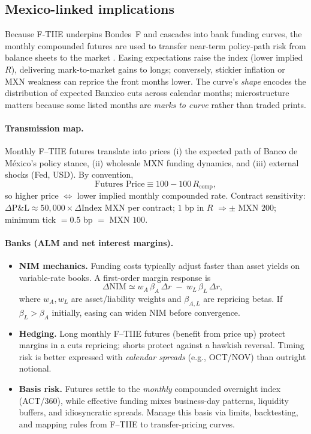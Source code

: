 \documentclass[11pt,a4paper]{article} %
\begin{document}
\subsection{Mexico-linked implications}
Because F-TIIE underpins Bondes~F and cascades into bank funding curves, the monthly compounded futures are used to transfer near-term policy-path risk from balance sheets to the market \citep{cme_tiie_monthly_overview,cme_ftiie_article}. Easing expectations raise the index (lower implied \(R\)), delivering mark-to-market gains to longs; conversely, stickier inflation or MXN weakness can reprice the front months lower. The curve’s \emph{shape} encodes the distribution of expected Banxico cuts across calendar months; microstructure matters because some listed months are \emph{marks to curve} rather than traded prints.

\paragraph{Transmission map.}
Monthly F--TIIE futures translate into prices (i) the expected path of Banco de México’s policy stance, (ii) wholesale MXN funding dynamics, and (iii) external shocks (Fed, USD). By convention,
\[
\text{Futures Price} \equiv 100 - 100\,R_{\text{comp}},
\]
so higher price $\Leftrightarrow$ lower implied monthly compounded rate. Contract sensitivity: $\Delta \mathrm{P\&L} \approx 50{,}000 \times \Delta \text{Index}$ MXN per contract; $1$ bp in $R$ $\Rightarrow \pm$ MXN $200$; minimum tick $=0.5$ bp $=$ MXN $100$.

\paragraph{Banks (ALM and net interest margins).}
\begin{itemize}
  \item \textbf{NIM mechanics.} Funding costs typically adjust faster than asset yields on variable-rate books. A first-order margin response is
  \[
  \Delta \mathrm{NIM} \simeq w_A\,\beta_A\,\Delta r \;-\; w_L\,\beta_L\,\Delta r,
  \]
  where $w_A,w_L$ are asset/liability weights and $\beta_{A,L}$ are repricing betas. If $\beta_L>\beta_A$ initially, easing can widen NIM before convergence.
  \item \textbf{Hedging.} Long monthly F--TIIE futures (benefit from price up) protect margins in a cuts repricing; shorts protect against a hawkish reversal. Timing risk is better expressed with \emph{calendar spreads} (e.g., OCT/NOV) than outright notional.
  \item \textbf{Basis risk.} Futures settle to the \emph{monthly} compounded overnight index (ACT/360), while effective funding mixes business-day patterns, liquidity buffers, and idiosyncratic spreads. Manage this basis via limits, backtesting, and mapping rules from F--TIIE to transfer-pricing curves.
\end{itemize}
\end{document}
